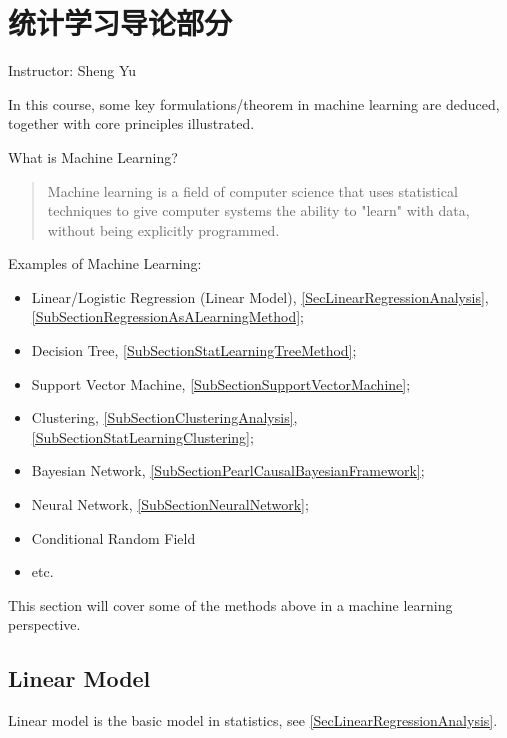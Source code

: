 \chapter{统计学习导论部分}
\begin{center}
    Instructor: Sheng Yu
\end{center}
    

    In this course, some key formulations/theorem in machine learning are deduced, together with core principles illustrated.

\begin{point}
    What is Machine Learning?
\end{point}

\begin{quote}
    Machine learning is a field of computer science that uses statistical techniques to give computer systems the ability to "learn" with data, without being explicitly programmed.
\end{quote}

Examples of Machine Learning:
    \begin{itemize}[topsep=2pt,itemsep=0pt]
        \item Linear/Logistic Regression (Linear Model), \autoref{SecLinearRegressionAnalysis}, \autoref{SubSectionRegressionAsALearningMethod};
        \item Decision Tree, \autoref{SubSectionStatLearningTreeMethod};
        \item Support Vector Machine, \autoref{SubSectionSupportVectorMachine};
        \item Clustering, \autoref{SubSectionClusteringAnalysis}, \autoref{SubSectionStatLearningClustering};
        \item Bayesian Network, \autoref{SubSectionPearlCausalBayesianFramework};
        \item Neural Network, \autoref{SubSectionNeuralNetwork};
        \item Conditional Random Field
        \item etc.
\end{itemize}

    This section will cover some of the methods above in a machine learning perspective.

\section{Linear Model}\label{SubSectionRegressionAsALearningMethod}
    Linear model is the basic model in statistics, see \autoref{SecLinearRegressionAnalysis}. 

